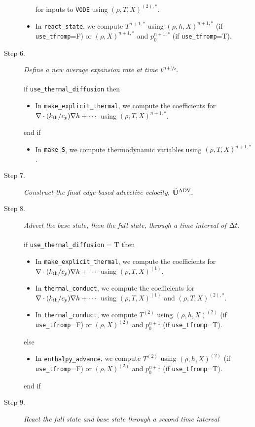 \begin{description}
\begin{itemize}
for inputs to {\tt VODE} using $(\rho,T,X)^{(2),*}$.
\item In {\tt react\_state}, we compute $T^{n+1,*}$ using $(\rho,h,X)^{n+1,*}$ 
(if {\tt use\_tfromp}=F) or $(\rho,X)^{n+1,*}$ and $p_0^{n+1,*}$ (if {\tt use\_tfromp}=T).
\end{itemize}
\item[Step 6.] {\em Define a new average expansion rate at time $t^\nph.$}\\ \\
if {\tt use\_thermal\_diffusion} then
\begin{itemize}
\item In {\tt make\_explicit\_thermal}, we compute the coefficients for 
$\nabla\cdot(k_{\rm th}/c_p)\nabla h + \cdots$ using $(\rho,T,X)^{n+1,*}$.
\end{itemize}
end if
\begin{itemize}
\item In {\tt make\_S}, we compute thermodynamic variables using $(\rho,T,X)^{n+1,*}$.
\end{itemize}
\item[Step 7.] {\em Construct the final edge-based advective velocity, $\widetilde{\mathbf{U}}^{\mathrm{ADV}}.$}
\item[Step 8.] {\em Advect the base state, then the full state, through a time interval 
of $\Delta t.$}\\ \\
if {\tt use\_thermal\_diffusion} = T then
\begin{itemize}
\item In {\tt make\_explicit\_thermal}, we compute the coefficients for 
$\nabla\cdot(k_{\rm th}/c_p)\nabla h + \cdots$ using $(\rho,T,X)^{(1)}$.
\item In {\tt thermal\_conduct}, we compute the coefficients for 
$\nabla\cdot(k_{\rm th}/c_p)\nabla h + \cdots$ using $(\rho,T,X)^{(1)}$ and $(\rho,T,X)^{(2),*}$.
\item In {\tt thermal\_conduct}, we compute $T^{(2)}$ using $(\rho,h,X)^{(2)}$
(if {\tt use\_tfromp}=F) or $(\rho,X)^{(2)}$ and $p_0^{n+1}$ (if {\tt use\_tfromp}=T).
\end{itemize}
else
\begin{itemize}
\item In {\tt enthalpy\_advance}, we compute $T^{(2)}$ using $(\rho,h,X)^{(2)}$
(if {\tt use\_tfromp}=F) or $(\rho,X)^{(2)}$ and $p_0^{n+1}$ (if {\tt use\_tfromp}=T).
\end{itemize}
end if
\item[Step 9.] {\em React the full state and base state through a second time interval 
}
\end{description}
